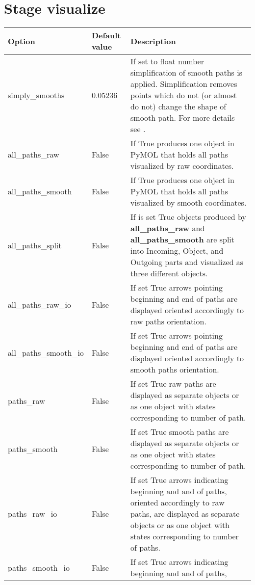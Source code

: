 \documentclass[a4paper,10pt,english]{sphinxmanual}
\begin{document}
\section{Stage \textbf{visualize}}
\label{valve/valve_config:stage-visualize}
\noindent\begin{tabulary}{\linewidth}{|L|L|L|}
\hline
\textsf{\relax 
Option
\unskip}\relax &\textsf{\relax 
Default value
\unskip}\relax &\textsf{\relax 
Description
\unskip}\relax \\
\hline
simply\_smooths
&
0.05236
&
If set to float number simplification of smooth paths is
applied. Simplification removes points which do not (or almost
do not) change the shape of smooth path. For more details see
{\hyperref[aqueduct.geom.traces:simply\string-smooths\string-details]{}}.
\\
\hline
all\_paths\_raw
&
False
&
If True produces one object in PyMOL that holds all paths
visualized by raw coordinates.
\\
\hline
all\_paths\_smooth
&
False
&
If True produces one object in PyMOL that holds all paths
visualized by smooth coordinates.
\\
\hline
all\_paths\_split
&
False
&
If is set True objects produced by \textbf{all\_paths\_raw} and
\textbf{all\_paths\_smooth} are split into Incoming, Object, and
Outgoing parts and visualized as three different objects.
\\
\hline
all\_paths\_raw\_io
&
False
&
If set True arrows pointing beginning and end of paths are
displayed oriented accordingly to raw paths orientation.
\\
\hline
all\_paths\_smooth\_io
&
False
&
If set True arrows pointing beginning and end of paths are
displayed oriented accordingly to smooth paths orientation.
\\
\hline
paths\_raw
&
False
&
If set True raw paths are displayed as separate objects or as
one object with states corresponding to number of path.
\\
\hline
paths\_smooth
&
False
&
If set True smooth paths are displayed as separate objects or
as one object with states corresponding to number of path.
\\
\hline
paths\_raw\_io
&
False
&
If set True arrows indicating beginning and and of paths,
oriented accordingly to raw paths, are displayed as separate
objects or as one object with states corresponding to number
of paths.
\\
\hline
paths\_smooth\_io
&
False
&
If set True arrows indicating beginning and and of paths,

\end{tabulary}
\end{document}
